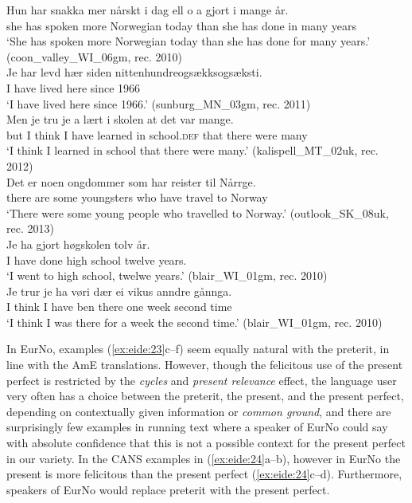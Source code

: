 \documentclass[output=paper]{langscibook}
\begin{document}
\ea%
    \label{ex:eide:23}
    \ea \label{ex:eide:23a} 
    \gll     Hun har snakka mer nårskt {i dag}    {ell   o a} gjort i mange år.     \\
             she has spoken more Norwegian today  {than she has} done   in many years\\
    \glt     ‘She has spoken more Norwegian today than she has done for many years.’ (coon\_valley\_WI\_06gm, rec. 2010)\\
    \ex \label{ex:eide:23b} 
    \gll Je har levd hær siden nittenhundreogsækksogsæksti. \\
         I have lived here since 1966          \\
    \glt ‘I have lived here since 1966.’ (sunburg\_MN\_03gm, rec. 2011) \\
    \ex \label{ex:eide:23c}  
    \gll  Men je tru je a lært i skolen at det var mange.      \\
         but I think I have learned in school.\textsc{def} that there were many \\
    \glt ‘I think I learned in school that there were many.’ (kalispell\_MT\_02uk, rec. 2012)\\
    \ex \label{ex:eide:23d}  
    \gll Det er noen ongdommer som har reister til Nårrge.    \\
         there are some youngsters who have travel to Norway    \\
    \glt ‘There were some young people who travelled to Norway.’ (outlook\_SK\_08uk, rec. 2013)\\
    \ex \label{ex:eide:23e} 
    \gll Je ha gjort høgskolen tolv år.        \\
         I have done {high school} twelve years. \\
    \glt ‘I went to high school, twelwe years.’ (blair\_WI\_01gm, rec. 2010)\\
    \ex \label{ex:eide:23f}
    \gll Je trur je ha vøri dær ei vikus anndre gånnga.   \\
         I think I have ben there one week second time    \\
    \glt ‘I think I was there for a week the second time.’  (blair\_WI\_01gm, rec. 2010)\\
    \z %
\z

In EurNo, examples (\ref{ex:eide:23}c--f) seem equally natural with the preterit, in line with the AmE translations. However, though the felicitous use of the present perfect is restricted by the \textit{cycles} and \textit{present relevance} effect, the language user very often has a choice between the preterit, the present, and the present perfect, depending on contextually given information or \textit{common ground}, and there are surprisingly few examples in running text where a speaker of EurNo could say with absolute confidence that this is not a possible context for the present perfect in our variety. In the CANS examples in (\ref{ex:eide:24}a--b), however in EurNo the present is more felicitous than the present perfect (\ref{ex:eide:24}c--d). Furthermore, speakers of EurNo would replace preterit with the present perfect.
\end{document}
